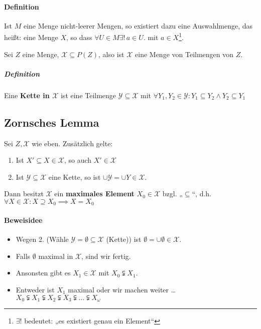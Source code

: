 \documentclass[14pt,a4paper]{article}
\begin{document}
  \paragraph{Definition}

  Ist $M$ eine Menge nicht-leerer Mengen, so existiert dazu eine Auswahlmenge,
  das heißt: eine Menge $X$, so dass $\forall U \in M \exists!\, a \in U$. mit $a
  \in X$\footnote{$\exists\text{!}$ bedeutet: „es existiert genau ein Element“}.

  Sei $Z$ eine Menge, $\mathscr{X} \subseteq P(Z)$, also ist $\mathscr{X}$
  eine Menge von Teilmengen von $Z$.

  \subparagraph{Definition}
  Eine \textbf{Kette in $\mathscr{X}$} ist eine Teilmenge $ \mathscr{Y}
  \subseteq \mathscr{X}$ mit $ \forall Y_1, Y_2 \in \mathscr{Y} : Y_1 \subseteq
  Y_2 \land Y_2 \subseteq Y_1 $

  \subsection{Zornsches Lemma}
  Sei $Z, \mathscr{X}$ wie eben.
  Zusätzlich gelte:
  \begin{enumerate}
    \item Ist $X' \subseteq X \in \mathscr{X}$, so auch $X' \in \mathscr{X}$
    \item Ist $\mathscr{Y \subseteq X}$ eine Kette, so ist $\cup \mathscr{Y} =
      \cup Y \in \mathscr{X}$.
  \end{enumerate}

  Dann besitzt $\mathscr{X}$ ein \textbf{maximales Element} $X_0 \in \mathscr{X}$ bzgl.
  „$\subseteq$“, d.h. $\forall X \in \mathscr{X}: X \supseteq X_0 \implies X =
  X_0$

  \paragraph{Beweisidee}
  \begin{itemize}
  \item Wegen 2. (Wähle $\mathscr{Y = \emptyset \subseteq X}$ (Kette)) ist $\emptyset
  = \cup \emptyset \in \mathscr{X}$.
  \item Falls $\emptyset$ maximal in $\mathscr{X}$, sind wir fertig.
  \item Ansonsten gibt es $X_1 \in \mathscr{X}$ mit $X_0 \subsetneqq X_1$.
  \item Entweder ist $X_1$ maximal oder wir machen weiter … \\
    $X_0 \subsetneqq X_1 \subsetneqq X_2 \subsetneqq X_3 \subsetneqq \ldots
    \subsetneqq X_\omega$
  \end{itemize}
\end{document}
